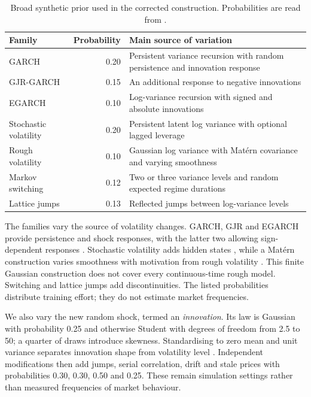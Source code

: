 \begin{table}[!htbp]
\centering
\caption[Synthetic prior components]{Broad synthetic prior used in the corrected construction. Probabilities are read from .}
\label{tab:simulation-prior}
\small
\begin{tabular}{p{}rp{}}
\toprule
Family & Probability & Main source of variation \\
\midrule
GARCH & 0.20 & Persistent variance recursion with random persistence and innovation response \\
GJR-GARCH & 0.15 & An additional response to negative innovations \\
EGARCH & 0.10 & Log-variance recursion with signed and absolute innovations \\
Stochastic volatility & 0.20 & Persistent latent log variance with optional lagged leverage \\
Rough volatility & 0.10 & Gaussian log variance with Mat\'ern covariance and varying smoothness \\
Markov switching & 0.12 & Two or three variance levels and random expected regime durations \\
Lattice jumps & 0.13 & Reflected jumps between log-variance levels \\
\bottomrule
\end{tabular}
\end{table}

The families vary the source of volatility changes. GARCH, GJR and EGARCH provide persistence and shock responses, with the latter two allowing sign-dependent responses \citep{bollerslev1986generalized,glosten1993relation,nelson1991conditional}. Stochastic volatility adds hidden states \citep{harvey1994multivariate}, while a Mat\'ern construction varies smoothness with motivation from rough volatility \citep{gatheral2018volatility}. This finite Gaussian construction does not cover every continuous-time rough model. Switching and lattice jumps add discontinuities. The listed probabilities distribute training effort; they do not estimate market frequencies.

We also vary the new random shock, termed an \emph{innovation}. Its law is Gaussian with probability 0.25 and otherwise Student with degrees of freedom from 2.5 to 50; a quarter of draws introduce skewness. Standardising to zero mean and unit variance separates innovation shape from volatility level \citep{fernandez1998bayesian}. Independent modifications then add jumps, serial correlation, drift and stale prices with probabilities 0.30, 0.30, 0.50 and 0.25. These remain simulation settings rather than measured frequencies of market behaviour.

